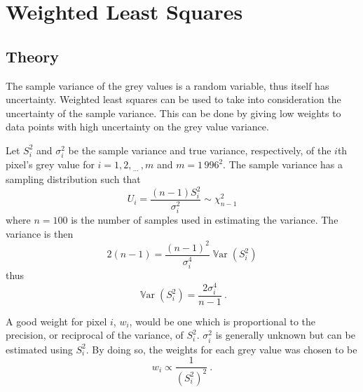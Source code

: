 \documentclass[12pt]{report}
\DeclareMathOperator{\variance}{\mathbb{V}ar}
\newcommand{\dotdotdot}{_{\phantom{.}\cdots}}
\begin{document}
\section{Weighted Least Squares}
\subsection{Theory}
The sample variance of the grey values is a random variable, thus itself has uncertainty. Weighted least squares can be used to take into consideration the uncertainty of the sample variance. This can be done by giving low weights to data points with high uncertainty on the grey value variance.

Let $S_i^2$ and $\sigma_i^2$ be the sample variance and true variance, respectively, of the $i$th pixel's grey value for $i=1,2,\dotdotdot,m$ and $m=1\,996^2$. The sample variance has a sampling distribution such that
\begin{equation}
U_i=\frac{(n-1)S_i^2}{\sigma_i^2}\sim\chi_{n-1}^2
\end{equation}
where $n=100$ is the number of samples used in estimating the variance. The variance is then
\begin{equation*}
2(n-1)=\frac{(n-1)^2}{\sigma_i^4}\variance\left(S_i^2\right)
\end{equation*}
thus
\begin{equation}
\variance\left(S_i^2\right)=\frac{2\sigma_i^4}{n-1} \ .
\end{equation}

A good weight for pixel $i$, $w_i$, would be one which is proportional to the precision, or reciprocal of the variance, of $S_i^2$. $\sigma_i^2$ is generally unknown but can be estimated using $S_i^2$. By doing so, the weights for each grey value was chosen to be
\begin{equation}
w_i \propto \frac{1}{\left(S_i^2\right)^2} \ .
\end{equation}
\end{document}
